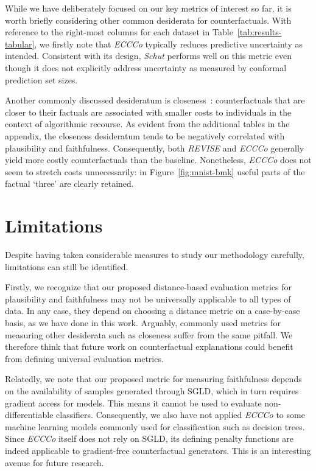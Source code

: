 \documentclass[letterpaper]{article} %
\begin{document}
While we have deliberately focused on our key metrics of interest so far, it is worth briefly considering other common desiderata for counterfactuals. With reference to the right-most columns for each dataset in Table~\ref{tab:results-tabular}, we firstly note that \textit{ECCCo} typically reduces predictive uncertainty as intended. Consistent with its design, \textit{Schut} performs well on this metric even though it does not explicitly address uncertainty as measured by conformal prediction set sizes. 

Another commonly discussed desideratum is closeness~\citep{wachter2017counterfactual}: counterfactuals that are closer to their factuals are associated with smaller costs to individuals in the context of algorithmic recourse. As evident from the additional tables in the appendix, the closeness desideratum tends to be negatively correlated with plausibility and faithfulness. Consequently, both \textit{REVISE} and \textit{ECCCo} generally yield more costly counterfactuals than the baseline. Nonetheless, \textit{ECCCo} does not seem to stretch costs unnecessarily: in Figure~\ref{fig:mnist-bmk} useful parts of the factual `three' are clearly retained.

\section{Limitations}

Despite having taken considerable measures to study our methodology carefully, limitations can still be identified. 

Firstly, we recognize that our proposed distance-based evaluation metrics for plausibility and faithfulness may not be universally applicable to all types of data. In any case, they depend on choosing a distance metric on a case-by-case basis, as we have done in this work. Arguably, commonly used metrics for measuring other desiderata such as closeness suffer from the same pitfall. We therefore think that future work on counterfactual explanations could benefit from defining universal evaluation metrics. 

Relatedly, we note that our proposed metric for measuring faithfulness depends on the availability of samples generated through SGLD, which in turn requires gradient access for models. This means it cannot be used to evaluate non-differentiable classifiers. Consequently, we also have not applied \textit{ECCCo} to some machine learning models commonly used for classification such as decision trees. Since \textit{ECCCo} itself does not rely on SGLD, its defining penalty functions are indeed applicable to gradient-free counterfactual generators. This is an interesting avenue for future research.
\end{document}
